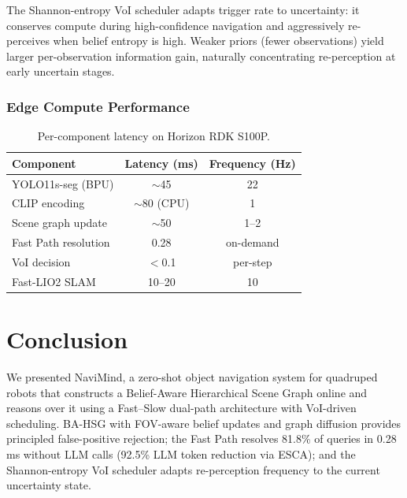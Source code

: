 \documentclass[conference]{IEEEtran}
\begin{document}
The Shannon-entropy VoI scheduler adapts trigger rate to uncertainty: it conserves compute during high-confidence navigation and aggressively re-perceives when belief entropy is high.
Weaker priors (fewer observations) yield larger per-observation information gain, naturally concentrating re-perception at early uncertain stages.

\subsubsection{Edge Compute Performance}

\begin{table}[t]
\centering
\caption{Per-component latency on Horizon RDK S100P.}
\label{tab:latency}
\footnotesize
\begin{tabular}{@{}lcc@{}}
\toprule
Component & Latency (ms) & Frequency (Hz) \\
\midrule
YOLO11s-seg (BPU)    & $\sim$45 & 22 \\
CLIP encoding        & $\sim$80 (CPU) & 1 \\
Scene graph update   & $\sim$50 & 1--2 \\
Fast Path resolution & 0.28     & on-demand \\
VoI decision         & $<$0.1   & per-step \\
Fast-LIO2 SLAM       & 10--20   & 10 \\
\bottomrule
\end{tabular}
\vspace{-2mm}
\end{table}

\section{Conclusion}
\label{sec:conclusion}

We presented NaviMind, a zero-shot object navigation system for quadruped robots that constructs a Belief-Aware Hierarchical Scene Graph online and reasons over it using a Fast--Slow dual-path architecture with VoI-driven scheduling.
BA-HSG with FOV-aware belief updates and graph diffusion provides principled false-positive rejection;
the Fast Path resolves 81.8\% of queries in 0.28\,ms without LLM calls (92.5\% LLM token reduction via ESCA);
and the Shannon-entropy VoI scheduler adapts re-perception frequency to the current uncertainty state.
\end{document}
